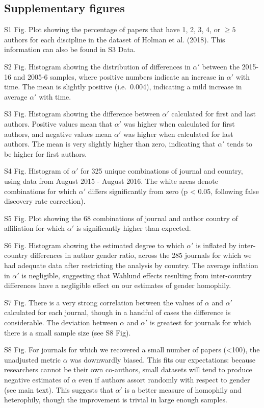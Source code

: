 \documentclass[12pt,]{article}
\begin{document}
\subsection{Supplementary figures}\label{supplementary-figures}

S1 Fig. Plot showing the percentage of papers that have 1, 2, 3, 4, or
\({\ge}5\) authors for each discipline in the dataset of Holman et al.
(2018). This information can also be found in S3 Data.

S2 Fig. Histogram showing the distribution of differences in \(\alpha'\)
between the 2015-16 and 2005-6 samples, where positive numbers indicate
an increase in \(\alpha'\) with time. The mean is slightly positive
(i.e.~0.004), indicating a mild increase in average \(\alpha'\) with
time.

S3 Fig. Histogram showing the difference between \(\alpha'\) calculated
for first and last authors. Positive values mean that \(\alpha'\) was
higher when calculated for first authors, and negative values mean
\(\alpha'\) was higher when calculated for last authors. The mean is
very slightly higher than zero, indicating that \(\alpha'\) tends to be
higher for first authors.

S4 Fig. Histogram of \(\alpha'\) for 325 unique combinations of journal
and country, using data from August 2015 - August 2016. The white areas
denote combinations for which \(\alpha'\) differs significantly from
zero (p \textless{} 0.05, following false discovery rate correction).

S5 Fig. Plot showing the 68 combinations of journal and author country
of affiliation for which \(\alpha'\) is significantly higher than
expected.

S6 Fig. Histogram showing the estimated degree to which \(\alpha'\) is
inflated by inter-country differences in author gender ratio, across the
285 journals for which we had adequate data after restricting the
analysis by country. The average inflation in \(\alpha'\) is negligible,
suggesting that Wahlund effects resulting from inter-country differences
have a negligible effect on our estimates of gender homophily.

S7 Fig. There is a very strong correlation between the values of
\(\alpha\) and \(\alpha'\) calculated for each journal, though in a
handful of cases the difference is considerable. The deviation between
\(\alpha\) and \(\alpha'\) is greatest for journals for which there is a
small sample size (see S8 Fig).

S8 Fig. For journals for which we recovered a small number of papers
(\textless{}100), the unadjusted metric \(\alpha\) was downwardly
biased. This fits our expectations: because researchers cannot be their
own co-authors, small datasets will tend to produce negative estimates
of \(\alpha\) even if authors assort randomly with respect to gender
(see main text). This suggests that \(\alpha'\) is a better measure of
homophily and heterophily, though the improvement is trivial in large
enough samples.
\end{document}
